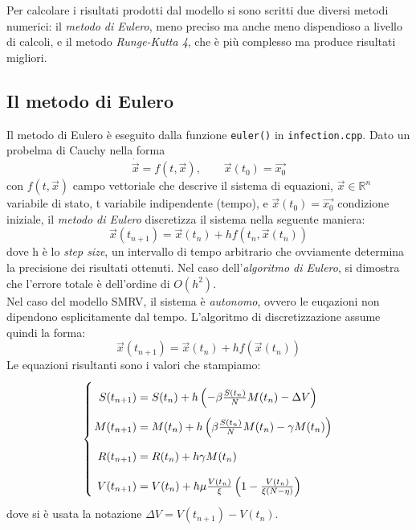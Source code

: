 \documentclass{article}
\begin{document}
\hspace{\parindent} Per calcolare i risultati prodotti dal modello 
si sono scritti due diversi metodi numerici: il \textit{metodo di Eulero},
meno preciso ma anche meno dispendioso a livello di calcoli, e il 
metodo \textit{Runge-Kutta 4}, che è più complesso ma produce 
risultati migliori.

\subsection{Il metodo di Eulero}
Il metodo di Eulero è eseguito dalla funzione \verb|euler()| in 
\verb|infection.cpp|. Dato un probelma di Cauchy nella forma
\begin{equation} \label{eq::ODE} 
    \dot{\vec{x}} = f(t, \vec{x}), \qquad \vec{x}(t_0) = \vec{x_0}
\end{equation}
con $f(t, \vec{x})$ campo vettoriale che descrive il sistema di 
equazioni, $\vec{x} \in \mathbb{R}^n$ variabile di stato, 
t variabile indipendente (tempo), e $\vec{x}(t_0) = \vec{x_0}$
condizione iniziale, il \textit{metodo di Eulero} discretizza il 
sistema nella seguente maniera:
\begin{equation} \label{eq::Euler}
    \vec{x}(t_{n+1})=\vec{x}(t_n) + h f(t_n, \vec{x}(t_n))
\end{equation}
dove h è lo \textit{step size}, un intervallo di tempo arbitrario che 
ovviamente determina la precisione dei risultati ottenuti. 
Nel caso dell'\textit{algoritmo di Eulero}, si dimostra che l'errore 
totale è dell'ordine di $O(h^2)$. \\
Nel caso del modello SMRV, il sistema è \textit{autonomo}, ovvero le 
euqazioni non dipendono esplicitamente dal tempo. L'algoritmo di 
discretizzazione assume quindi la forma: 
\begin{equation} \label{eq::autoEuler}
    \vec{x}(t_{n+1})=\vec{x}(t_n) + h f(\vec{x}(t_n))
\end{equation}
Le equazioni risultanti sono i valori che stampiamo:
\begin{equation}\label{eq::euler}
    \left\{ \arraycolsep=1.4pt\def\arraystretch{2.2}
    \begin{array}{rcl}
    S(t_{n+1}) & = & S(t_n) + h \left(-\beta \frac{S(t_n)}{N} M(t_n)
            -\Delta V \right) \\
    M(t_{n+1}) & = & M(t_n)+h\left(\beta \frac{S(t_n)}{N} M(t_n) 
            - \gamma M(t_n)\right) \\
    R(t_{n+1}) & = & R(t_n) + h \gamma M(t_n) \\
    V(t_{n+1}) & = & V(t_n) +h \mu \frac{V(t_n)}{\xi} \left(
            1 - \frac{V(t_n)}{\xi (N - \eta)} \right) \\
    \end{array}\right.
\end{equation}
dove si è usata la notazione $\Delta V = V(t_{n+1})-V(t_n)$. 
\end{document}
